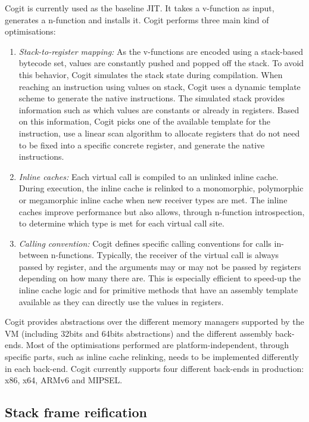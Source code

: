 \documentclass[a4paper,12pt,twoside]{../includes/ThesisStyle}
\begin{document}
Cogit is currently used as the baseline JIT. It takes a v-function as input, generates a n-function and installs it. Cogit performs three main kind of optimisations:
\begin{enumerate}
	\item \emph{Stack-to-register mapping:} As the v-functions are encoded using a stack-based bytecode set, values are constantly pushed and popped off the stack. To avoid this behavior, Cogit simulates the stack state during compilation. When reaching an instruction using values on stack, Cogit uses a dynamic template scheme to generate the native instructions. The simulated stack provides information such as which values are constants or already in registers. Based on this information, Cogit picks one of the available template for the instruction, use a linear scan algorithm to allocate registers that do not need to be fixed into a specific concrete register, and generate the native instructions.
	\item \emph{Inline caches:} Each virtual call is compiled to an unlinked inline cache. During execution, the inline cache is relinked to a monomorphic, polymorphic or megamorphic inline cache when new receiver types are met. The inline caches improve performance but also allows, through n-function introspection, to determine which type is met for each virtual call site.
	\item \emph{Calling convention:} Cogit defines specific calling conventions for calls in-between n-functions. Typically, the receiver of the virtual call is always passed by register, and the arguments may or may not be passed by registers depending on how many there are. This is especially efficient to speed-up the inline cache logic and for primitive methods that have an assembly template available as they can directly use the values in registers.
\end{enumerate}

Cogit provides abstractions over the different memory managers supported by the VM (including 32bits and 64bits abstractions) and the different assembly back-ends. Most of the optimisations performed are platform-independent, through specific parts, such as inline cache relinking, needs to be implemented differently in each back-end. Cogit currently supports four different back-ends in production: x86, x64, ARMv6 and MIPSEL.

\subsection{Stack frame reification}
\end{document}
